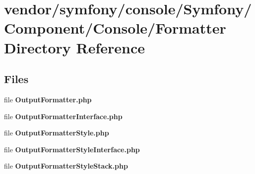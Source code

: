 \section{vendor/symfony/console/\+Symfony/\+Component/\+Console/\+Formatter Directory Reference}
\label{dir_89acc437864ada880c1e4aca5c99f524}
\subsection*{Files}
\begin{DoxyCompactItemize}
\item 
file {\bf Output\+Formatter.\+php}
\item 
file {\bf Output\+Formatter\+Interface.\+php}
\item 
file {\bf Output\+Formatter\+Style.\+php}
\item 
file {\bf Output\+Formatter\+Style\+Interface.\+php}
\item 
file {\bf Output\+Formatter\+Style\+Stack.\+php}
\end{DoxyCompactItemize}
